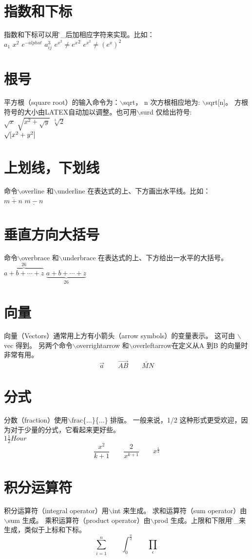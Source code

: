 \documentclass[a4paper,11pt]{ctexart}
\begin{document}
\section{指数和下标}
指数和下标可以用\^和\_后加相应字符来实现。比如：\\
$a_{1}$ \qquad
$x^{2}$ \qquad
$e^{-alpha t}$ \qquad
$a^{3}_{ij}$  \qquad
$e^{x^2} \neq {e^x}^2$ \qquad
$e^{x^2} \neq (e^x)^2$

\section{根号}
平方根（square root）的输入命令为：$\backslash$sqrt，
n 次方根相应地为: $\backslash$sqrt[n]。
方根符号的大小由LATEX自动加以调整。也可用$\backslash$surd 仅给出符号: \\
$\sqrt{x}$ \qquad
$\sqrt{x^{2}+\sqrt{y} }$ \qquad
$\sqrt[3]{2}$   \qquad
\\[3pt]$\surd[x^2 + y^2]$ 

\section{上划线，下划线}
命令$\backslash$overline 和$\backslash$underline 在表达式的上、下方画出水平线。比如： \\
$\overline{m+n}$ \qquad
$\underline{m-n}$

\section{垂直方向大括号}
命令$\backslash$overbrace 和$\backslash$underbrace 在表达式的上、下方给出一水平的大括号。\\
$\overbrace{ a+b+\cdots+z }^{26}$ \qquad
$\underbrace{ a+b+\cdots+z }_{26}$

\section{向量}
向量（Vectors）通常用上方有小箭头（arrow symbols）的变量表示。
这可由 $\backslash$vec 得到。
另两个命令$\backslash$overrightarrow 和$\backslash$overleftarrow在定义从A 到B 的向量时非常有用。\\
\begin{displaymath}
\vec a \qquad
\overrightarrow{AB} \qquad
\overleftarrow{MN}
\end{displaymath}

\section{分式}
分数（fraction）使用$\backslash$frac\{...\}\{...\} 排版。
一般来说，1/2 这种形式更受欢迎，因为对于少量的分式，它看起来更好些。\\
$1\frac{1}{2}Hour$ \qquad
\begin{displaymath}
  \frac{x^2}{k+1} \qquad
  \frac{2}{x^{k+1}} \qquad
  x^{\frac{1}{2}}
\end{displaymath}

\section{积分运算符}
积分运算符（integral operator）用$\backslash$int 来生成。
求和运算符（sum operator）由$\backslash$sum 生成。
乘积运算符（product operator）由$\backslash$prod 生成。上限和下限用\^ 和\_来生成，类似于上标和下标。\\
\begin{displaymath}
\sum_{i=1}^{n} \qquad
\int_{0}^{\frac{\pi}{2}} \qquad
\prod_{\epsilon}
\end{displaymath}
\end{document}
